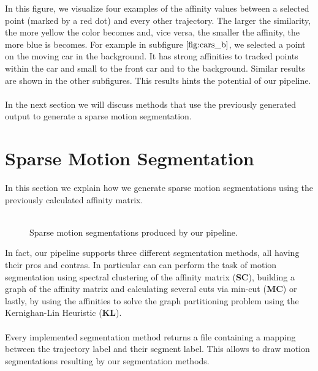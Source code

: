 In this figure, we visualize four examples of the affinity values between a selected point (marked by a red dot) and every other trajectory. The larger the similarity, the more yellow the color becomes and, vice versa,  the smaller the affinity, the more blue is becomes. For example in subfigure $\ref{fig:cars_b}$, we selected a point on the moving car in the background. It has strong affinities to tracked points within the car and small to the front car and to the background. Similar results are shown in the other subfigures. This results hints the potential of our pipeline. \\ \\
In the next section we will discuss methods that use the previously generated output to generate a sparse motion segmentation.

\section{Sparse Motion Segmentation}
\label{sec:sparse_motion_segmentation}
In this section we explain how we generate sparse motion segmentations using the previously calculated affinity matrix. \\ \\
\begin{figure}[H]
\begin{center}
\end{center}
\caption[Sparse Segmentations]{Sparse motion segmentations produced by our pipeline.}
\label{fig:sparse_segmentations}
\end{figure}
In fact, our pipeline supports three different segmentation methods, all having their pros and contras. In particular can can perform the task of motion segmentation using spectral clustering of the affinity matrix (\textbf{SC}), building a graph of the affinity matrix and calculating several cuts via min-cut (\textbf{MC}) or lastly, by using the affinities to solve the graph partitioning problem using the Kernighan-Lin Heuristic (\textbf{KL}). \\ \\
Every implemented segmentation method returns a file containing a mapping between the trajectory label and their segment label. This allows to draw motion segmentations resulting by our segmentation methods. \\ \\
